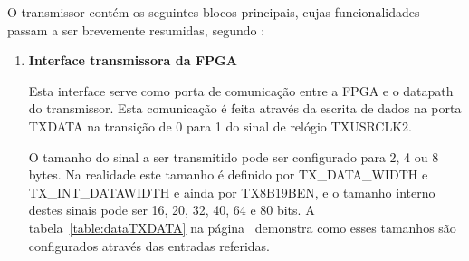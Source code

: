 O transmissor contém os seguintes blocos principais, cujas funcionalidades passam a ser brevemente resumidas, segundo \cite{R010}:
\begin{enumerate}
	

	\item \textbf{Interface transmissora da FPGA}
	
	\hspace{1.0em}Esta interface serve como porta de comunicação entre a FPGA e o datapath do transmissor. Esta comunicação é feita através da escrita de dados na porta TXDATA na transição de 0 para 1 do sinal de relógio TXUSRCLK2.
	
	\hspace{1.0em}O tamanho do sinal a ser transmitido pode ser configurado para 2, 4 ou 8 bytes. Na realidade este tamanho é definido por TX\_DATA\_WIDTH e TX\_INT\_DATAWIDTH e ainda por TX8B19BEN, e o tamanho interno destes sinais pode ser 16, 20, 32, 40, 64 e 80 bits. A tabela~\ref{table:dataTXDATA} na página~\pageref{table:dataTXDATA} demonstra como esses tamanhos são configurados através das entradas referidas.
	

\end{enumerate}
